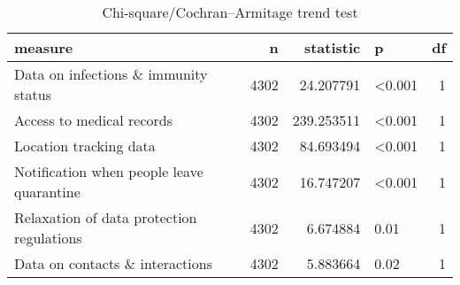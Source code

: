 \begin{table*}

\caption{Chi-square/Cochran–Armitage trend test\label{tbl:trend}}
\begin{tabular}[t]{lrrlr}
\toprule
measure & n & statistic & p & df\\
\midrule
Data on infections \&
immunity status & 4302 & 24.207791 & <0.001 & 1\\
Access to
medical records & 4302 & 239.253511 & <0.001 & 1\\
Location
tracking data & 4302 & 84.693494 & <0.001 & 1\\
Notification when people
leave quarantine & 4302 & 16.747207 & <0.001 & 1\\
Relaxation of data
protection regulations & 4302 & 6.674884 & 0.01 & 1\\
\addlinespace
Data on contacts
\& interactions & 4302 & 5.883664 & 0.02 & 1\\
\bottomrule
\end{tabular}
\end{table*}
